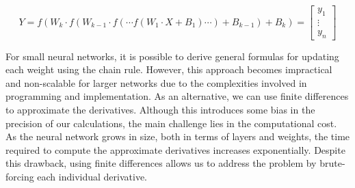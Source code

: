 \[
Y = f(W_k \cdot f(
W_{k - 1} \cdot f(\cdots f(W_{1} \cdot X + B_1) \cdots) + B_{k - 1}
) + B_k) = \begin{bmatrix} y_1 \\ \vdots \\ y_{n} \end{bmatrix}
\]

For small neural networks, it is possible to derive general formulas for updating each weight using the
chain rule. However, this approach becomes impractical and non-scalable for larger networks due to the
complexities involved in programming and implementation. As an alternative, we can use finite differences
to approximate the derivatives. Although this introduces some bias in the precision of our calculations,
the main challenge lies in the computational cost. As the neural network grows in size, both in terms of
layers and weights, the time required to compute the approximate derivatives increases exponentially.
Despite this drawback, using finite differences allows us to address the problem by brute-forcing each
individual derivative.\\

